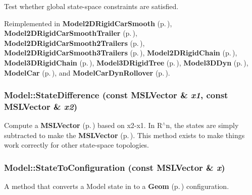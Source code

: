 Test whether global state-space constraints are satisfied.



Reimplemented in {\bf Model2DRigid\-Car\-Smooth} {\rm (p.\,\pageref{classModel2DRigidCarSmooth_a6})}, {\bf Model2DRigid\-Car\-Smooth\-Trailer} {\rm (p.\,\pageref{classModel2DRigidCarSmoothTrailer_a5})}, {\bf Model2DRigid\-Car\-Smooth2Trailers} {\rm (p.\,\pageref{classModel2DRigidCarSmooth2Trailers_a5})}, {\bf Model2DRigid\-Car\-Smooth3Trailers} {\rm (p.\,\pageref{classModel2DRigidCarSmooth3Trailers_a5})}, {\bf Model2DRigid\-Chain} {\rm (p.\,\pageref{classModel2DRigidChain_a6})}, {\bf Model3DRigid\-Chain} {\rm (p.\,\pageref{classModel3DRigidChain_a6})}, {\bf Model3DRigid\-Tree} {\rm (p.\,\pageref{classModel3DRigidTree_a6})}, {\bf Model3DDyn} {\rm (p.\,\pageref{classModel3DDyn_a3})}, {\bf Model\-Car} {\rm (p.\,\pageref{classModelCar_a3})}, and {\bf Model\-Car\-Dyn\-Rollover} {\rm (p.\,\pageref{classModelCarDynRollover_a8})}.
\subsubsection{ Model::State\-Difference (const {\bf MSLVector} \& {\em x1}, const {\bf MSLVector} \& {\em x2})\hspace{0.3cm}{\tt  [virtual]}}\label{classModel_a7}


Compute a {\bf MSLVector} {\rm (p.\,\pageref{classMSLVector})} based on x2-x1. In R$^\wedge$n, the states are simply subtracted to make the {\bf MSLVector} {\rm (p.\,\pageref{classMSLVector})}. This method exists to make things work correctly for other state-space topologies.

\subsubsection{ Model::State\-To\-Configuration (const {\bf MSLVector} \& {\em x})\hspace{0.3cm}{\tt  [virtual]}}\label{classModel_a8}


A method that converts a Model state in to a {\bf Geom} {\rm (p.\,\pageref{classGeom})} configuration.



